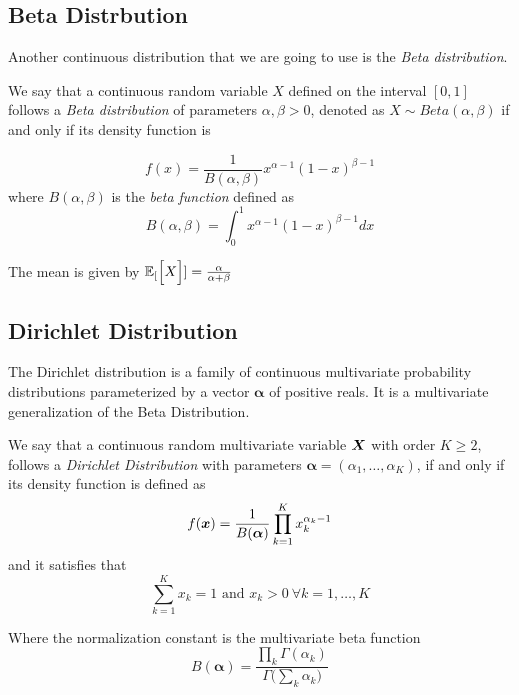 \subsection{Beta Distrbution}

Another continuous distribution that we are going to use is the \emph{Beta
  distribution}.

\begin{definition}
We say that a continuous random variable \(X\) defined on the
interval \([0,1]\) follows a \emph{Beta distribution} of parameters \(\alpha,
\beta > 0\), denoted as \(X \sim Beta(\alpha, \beta)\) if and only if its
density function is

\[
  f(x) = \frac{1}{B(\alpha, \beta)}x^{\alpha - 1}(1-x)^{\beta -1}
\]
where \(B(\alpha, \beta)\) is the \emph{beta function} defined as
\[
  B(\alpha, \beta) = \int_0^1 x^{\alpha - 1}(1-x)^{\beta -1} dx
\]
\end{definition}

The mean is given by \(\mathbb{E}_{[}\Big[X\Big]] = \frac{\alpha}{\alpha + \beta}\)

\subsection{Dirichlet Distribution}

The Dirichlet distribution is a family of continuous multivariate probability
distributions parameterized by a vector \(\bm{\alpha}\) of positive reals. It is
a multivariate generalization of the Beta Distribution.

\begin{definition}
  We say that a continuous random multivariate variable \(\bm{X}\) with order
  \(K \geq 2\), follows a \emph{Dirichlet
    Distribution} with parameters \(\bm{\alpha} = (\alpha_{1}, \dots, \alpha_{K})\), if and
  only if its density function is defined as
  \[
    f(\bm{x}) = \frac{1}{B(\bm{\alpha})}\prod_{k = 1}^{K}x_{k}^{\alpha_{k}-1}
  \]
  and it satisfies that
  \[
    \sum_{k=1}^{K} x_{k} = 1 \text{ and } x_{k} > 0 \ \forall k=1,\dots,K
  \]
\end{definition}

Where the normalization constant is the multivariate beta function
\[
  B(\bm{\alpha}) = \frac{\prod_{k} \Gamma (\alpha_{k})}{\Gamma \big( \sum_{k}\alpha_{k} \big)}
\]


